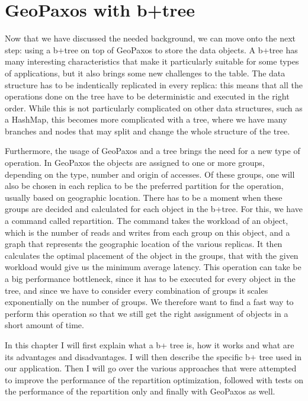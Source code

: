 \chapter{GeoPaxos with b+tree}\label{sec:geopaxos-with-b+tree}
Now that we have discussed the needed background, we can move onto the next step: using a b+tree on top of GeoPaxos to store the data objects. A b+tree has many interesting characteristics that make it particularly suitable for some types of applications, but it also brings some new challenges to the table. The data structure has to be indentically replicated in every replica: this means that all the operations done on the tree have to be deterministic and executed in the right order. While this is not particularly complicated on other data structures, such as a HashMap, this becomes more complicated with a tree, where we have many branches and nodes that may split and change the whole structure of the tree.

Furthermore, the usage of GeoPaxos and a tree brings the need for a new type of operation. In GeoPaxos the objects are assigned to one or more groups, depending on the type, number and origin of accesses. Of these groups, one will also be chosen in each replica to be the preferred partition for the operation, usually based on geographic location. There has to be a moment when these groups are decided and calculated for each object in the b+tree. For this, we have a command called repartition. The command takes the workload of an object, which is the number of reads and writes from each group on this object, and a graph that represents the geographic location of the various replicas. It then calculates the optimal placement of the object in the groups, that with the given workload would give us the minimum average latency. This operation can take be a big performance bottleneck, since it has to be executed for every object in the tree, and since we have to consider every combination of groups it scales exponentially on the number of groups. We therefore want to find a fast way to perform this operation so that we still get the right assignment of objects in a short amount of time.

In this chapter I will first explain what a b+ tree is, how it works and what are its advantages and disadvantages. I will then describe the specific b+ tree used in our application. Then I will go over the various approaches that were attempted to improve the performance of the repartition optimization, followed with tests on the performance of the repartition only and finally with GeoPaxos as well.

